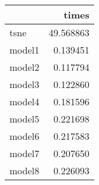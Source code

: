 \begin{tabular}{lr}
\toprule
{} &      times \\
\midrule
tsne   &  49.568863 \\
model1 &   0.139451 \\
model2 &   0.117794 \\
model3 &   0.122860 \\
model4 &   0.181596 \\
model5 &   0.221698 \\
model6 &   0.217583 \\
model7 &   0.207650 \\
model8 &   0.226093 \\
\bottomrule
\end{tabular}
